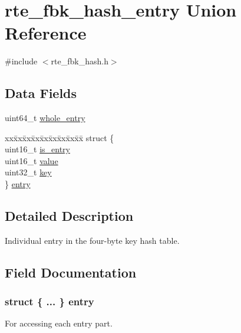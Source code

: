 \hypertarget{unionrte__fbk__hash__entry}{}\section{rte\+\_\+fbk\+\_\+hash\+\_\+entry Union Reference}
\label{unionrte__fbk__hash__entry}


{\ttfamily \#include $<$rte\+\_\+fbk\+\_\+hash.\+h$>$}

\subsection*{Data Fields}
\begin{DoxyCompactItemize}
\item 
uint64\+\_\+t \hyperlink{unionrte__fbk__hash__entry_a4d4a628be294f3475bab325721d58073}{whole\+\_\+entry}
\item 
\begin{tabbing}
xx\=xx\=xx\=xx\=xx\=xx\=xx\=xx\=xx\=\kill
struct \{\\
\>uint16\_t \hyperlink{unionrte__fbk__hash__entry_ac6e92ffe3a06cf9cdf87ca3557774f14}{is\_entry}\\
\>uint16\_t \hyperlink{unionrte__fbk__hash__entry_a900b69af7d674b8db3bceae754b4955a}{value}\\
\>uint32\_t \hyperlink{unionrte__fbk__hash__entry_a6d4ec8e4f3148d51041635da9986c3fa}{key}\\
\} \hyperlink{unionrte__fbk__hash__entry_ae7994973b75fceb802fd20d9f90758ad}{entry}\\

\end{tabbing}\end{DoxyCompactItemize}


\subsection{Detailed Description}
Individual entry in the four-\/byte key hash table. 

\subsection{Field Documentation}
\hypertarget{unionrte__fbk__hash__entry_ae7994973b75fceb802fd20d9f90758ad}{}
\subsubsection[{entry}]{\setlength{\rightskip}{0pt plus 5cm}struct \{ ... \}   entry}\label{unionrte__fbk__hash__entry_ae7994973b75fceb802fd20d9f90758ad}
For accessing each entry part. \hypertarget{unionrte__fbk__hash__entry_ac6e92ffe3a06cf9cdf87ca3557774f14}{}
